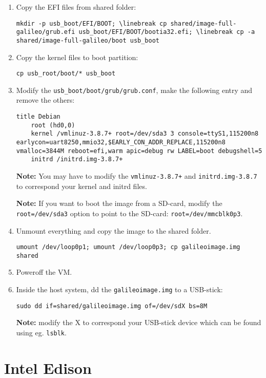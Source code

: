 \documentclass[a4paper,11pt]{article}
\newcommand{\note}{\textbf{Note: }}
\newcommand{\cmd}[1]{\texttt{#1}}
\begin{document}
\begin{enumerate}
\item Copy the EFI files from shared folder: 
\begin{lstlisting}
mkdir -p usb_boot/EFI/BOOT; \linebreak cp shared/image-full-galileo/grub.efi usb_boot/EFI/BOOT/bootia32.efi; \linebreak cp -a shared/image-full-galileo/boot usb_boot
\end{lstlisting}

\item Copy the kernel files to boot partition: 
\begin{lstlisting}
cp usb_root/boot/* usb_boot
\end{lstlisting}

\item Modify the \cmd{usb\_boot/boot/grub/grub.conf}, make the following entry and remove the others:
\begin{lstlisting}
title Debian
    root (hd0,0)
    kernel /vmlinuz-3.8.7+ root=/dev/sda3 3 console=ttyS1,115200n8 earlycon=uart8250,mmio32,$EARLY_CON_ADDR_REPLACE,115200n8 vmalloc=3844M reboot=efi,warm apic=debug rw LABEL=boot debugshell=5
    initrd /initrd.img-3.8.7+
\end{lstlisting}
\note You may have to modify the \cmd{vmlinuz-3.8.7+} and \cmd{initrd.img-3.8.7} to correspond your kernel and initrd files.

\note If you want to boot the image from a SD-card, modify the \cmd{root=/dev/sda3} option to point to the SD-card: \cmd{root=/dev/mmcblk0p3}.

\item Unmount everything and copy the image to the shared folder. 
\begin{lstlisting}
umount /dev/loop0p1; umount /dev/loop0p3; cp galileoimage.img shared
\end{lstlisting}

\item Poweroff the VM.

\item Inside the host system, dd the \cmd{galileoimage.img} to a USB-stick: 
\begin{lstlisting}
sudo dd if=shared/galileoimage.img of=/dev/sdX bs=8M
\end{lstlisting}

\note modify the X to correspond your USB-stick device which can be found using eg. \cmd{lsblk}.
\end{enumerate}

\section{Intel Edison}
\label{edison}
\end{document}
